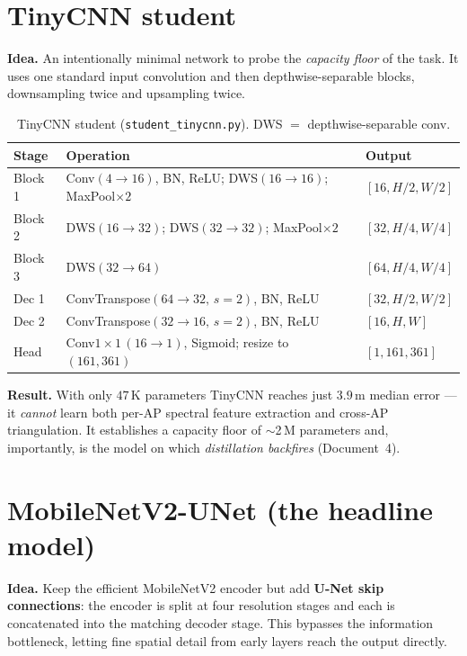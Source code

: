 \documentclass[11pt,a4paper]{article}
\newcommand{\code}[1]{\texttt{\small #1}}
\begin{document}
\section{TinyCNN student}

\textbf{Idea.} An intentionally minimal network to probe the \emph{capacity floor} of the task.
It uses one standard input convolution and then depthwise-separable blocks, downsampling twice
and upsampling twice.

\begin{table}[h]
\centering
\caption{TinyCNN student (\code{student\_tinycnn.py}). DWS $=$ depthwise-separable conv.}
\begin{tabular}{@{}lll@{}}
\toprule
Stage & Operation & Output \\
\midrule
Block 1 & Conv$(4\!\to\!16)$, BN, ReLU; DWS$(16\!\to\!16)$; MaxPool$\times2$ & $[16, H/2, W/2]$ \\
Block 2 & DWS$(16\!\to\!32)$; DWS$(32\!\to\!32)$; MaxPool$\times2$           & $[32, H/4, W/4]$ \\
Block 3 & DWS$(32\!\to\!64)$                                                 & $[64, H/4, W/4]$ \\
Dec 1   & ConvTranspose$(64\!\to\!32,\,s{=}2)$, BN, ReLU                     & $[32, H/2, W/2]$ \\
Dec 2   & ConvTranspose$(32\!\to\!16,\,s{=}2)$, BN, ReLU                     & $[16, H, W]$ \\
Head    & Conv$1\times1\,(16\!\to\!1)$, Sigmoid; resize to $(161,361)$       & $[1,161,361]$ \\
\bottomrule
\end{tabular}
\end{table}

\textbf{Result.} With only $47$\,K parameters TinyCNN reaches just $3.9$\,m median error --- it
\emph{cannot} learn both per-AP spectral feature extraction and cross-AP triangulation. It
establishes a capacity floor of $\sim$2\,M parameters and, importantly, is the model on which
\emph{distillation backfires} (Document~4).

\section{MobileNetV2-UNet (the headline model)}

\textbf{Idea.} Keep the efficient MobileNetV2 encoder but add \textbf{U-Net skip connections}: the
encoder is split at four resolution stages and each is concatenated into the matching decoder
stage. This bypasses the information bottleneck, letting fine spatial detail from early layers
reach the output directly.
\end{document}
